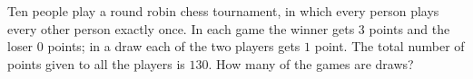 Ten people play a round robin chess tournament, in which every person plays every other person exactly once. In each game the winner gets $3$ points and the loser $0$ points; in a draw each of the two players gets $1$ point. The total number of points given to all the players is $130$. How many of the games are draws?
